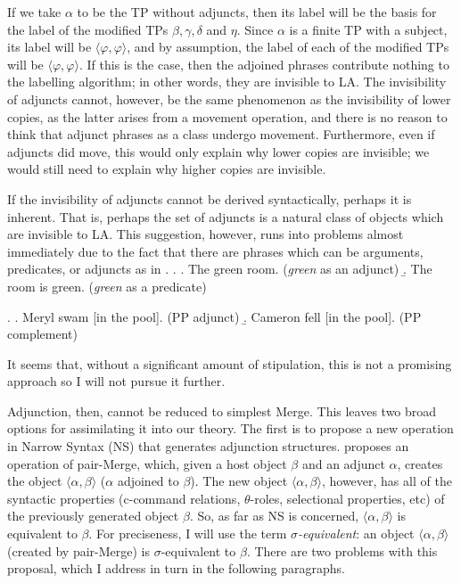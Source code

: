 \documentclass[MilwayThesis]{subfiles}
\begin{document}
If we take $\alpha$ to be the TP without adjuncts, then its label will be the basis for the label of the modified TPs $\beta, \gamma, \delta$ and $\eta$.
Since $\alpha$ is a finite TP with a subject, its label will be $\langle\varphi,\varphi\rangle$, and by assumption, the label of each of the modified TPs will be $\langle\varphi,\varphi\rangle$.
If this is the case, then the adjoined phrases contribute nothing to the labelling algorithm; in other words, they are invisible to LA.
The invisibility of adjuncts cannot, however, be the same phenomenon as the invisibility of lower copies, as the latter arises from a movement operation, and there is no reason to think that adjunct phrases as a class undergo movement.
Furthermore, even if adjuncts did move, this would only explain why lower copies are invisible; we would still need to explain why higher copies are invisible.

If the invisibility of adjuncts cannot be derived syntactically, perhaps it is inherent.
That is, perhaps the set of adjuncts is a natural class of objects which are invisible to LA.
This suggestion, however, runs into problems almost immediately due to the fact that there are phrases which can be arguments, predicates, or adjuncts as in .
\ex. \label{ex:Adjective}
\a. The green room. (\textit{green} as an adjunct)
\b. The room is green. (\textit{green} as a predicate)

\ex. \label{ex:PP} 
\a. Meryl swam [in the pool]. (PP adjunct)
\b. Cameron fell [in the pool]. (PP complement)

It seems that, without a significant amount of stipulation, this is not a promising approach so I will not pursue it further.

Adjunction, then, cannot be reduced to simplest Merge.
This leaves two broad options for assimilating it into our theory.
The first is to propose a new operation in Narrow Syntax (NS) that generates adjunction structures.
\textcite{chomsky2004beyond} proposes an operation of pair-Merge, which, given a host object $\beta$ and an adjunct $\alpha$, creates the object $\langle\alpha,\beta\rangle$ ($\alpha$ adjoined to $\beta$).
The new object $\langle\alpha,\beta\rangle$, however, has all of the syntactic properties (c-command relations, $\theta$-roles, selectional properties, etc) of the previously generated object $\beta$.
So, as far as NS is concerned, $\langle\alpha,\beta\rangle$ is equivalent to $\beta$.
For preciseness, I will use the term $\sigma$\textit{-equivalent}: an object $\langle\alpha,\beta\rangle$ (created by pair-Merge) is $\sigma$-equivalent to $\beta$.
There are two problems with this proposal, which I address in turn in the following paragraphs.
\end{document}
